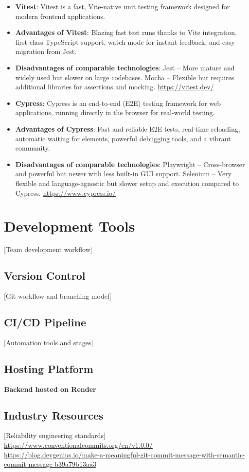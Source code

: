 \begin{itemize}
    \item \textbf{Vitest}: Vitest is a fast, Vite-native unit testing framework designed for modern frontend applications.
    \item \textbf{Advantages of Vitest}: Blazing fast test runs thanks to Vite integration, first-class TypeScript support, watch mode for instant feedback, and easy migration from Jest.
    \item \textbf{Disadvantages of comparable technologies}: 
    Jest – More mature and widely used but slower on large codebases. 
    Mocha – Flexible but requires additional libraries for assertions and mocking.
    \url{https://vitest.dev/}

    \item \textbf{Cypress}: Cypress is an end-to-end (E2E) testing framework for web applications, running directly in the browser for real-world testing.
    \item \textbf{Advantages of Cypress}: Fast and reliable E2E tests, real-time reloading, automatic waiting for elements, powerful debugging tools, and a vibrant community.
    \item \textbf{Disadvantages of comparable technologies}: 
    Playwright – Cross-browser and powerful but newer with less built-in GUI support. 
    Selenium – Very flexible and language-agnostic but slower setup and execution compared to Cypress.
    \url{https://www.cypress.io/}
\end{itemize}


\section{Development Tools}
[Team development workflow]

\subsection{Version Control}
[Git workflow and branching model]

\subsection{CI/CD Pipeline}
[Automation tools and stages]

\subsection{Hosting Platform}
\textbf{Backend hosted on Render}

\subsection{Industry Resources}
[Reliability engineering standards]
\url{https://www.conventionalcommits.org/en/v1.0.0/}
\url{https://blog.devgenius.io/make-a-meaningful-git-commit-message-with-semantic-commit-message-b39a79b13aa3}